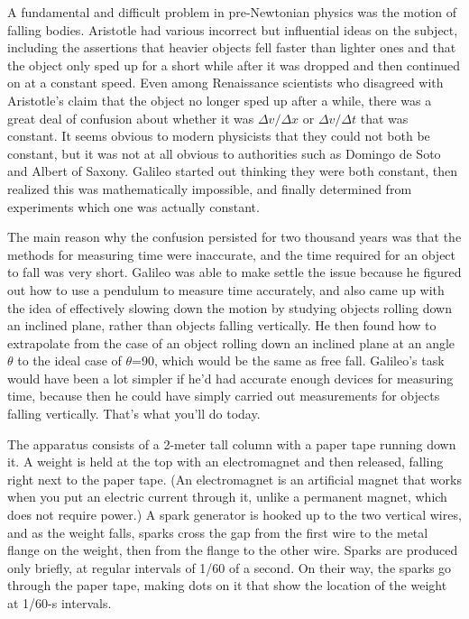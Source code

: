 \label{lab:free-fall}

\apparatus
{}


\introduction

A fundamental and difficult problem in pre-New\-ton\-ian physics
was the motion of falling bodies.  Aristotle had various
incorrect but influential ideas on the subject, including
the assertions that heavier objects fell faster than lighter
ones and that the object only sped up for a short while
after it was dropped and then continued on at a constant
speed. Even among Renaissance scientists who disagreed with
Aristotle's claim that the object no longer sped up after a
while, there was a great deal of confusion about whether it
was $\Delta v/\Delta x$ or $\Delta v/\Delta t$ that was
constant.  It seems obvious to modern physicists that they
could not both be constant, but it was not at all obvious to
authorities such as Domingo de Soto and Albert of Saxony. 
Galileo started out thinking they were both constant, then
realized this was mathematically impossible, and finally
determined from experiments which one was actually constant.

The main reason why the confusion persisted for two thousand
years was that the methods for measuring time were
inaccurate, and the time required for an object to fall was
very short.  Galileo was able to make settle the issue
because he figured out how to use a pendulum to measure time
accurately, and also came up with the idea of effectively
slowing down the motion by studying objects rolling down an
inclined plane, rather than objects falling vertically.  He
then found how to extrapolate from the case of an object
rolling down an inclined plane at an angle $\theta $ to the
ideal case of $\theta $=90\degunit, which would be the same
as free fall.  Galileo's task would have been a lot simpler
if he'd had accurate enough devices for measuring time,
because then he could have simply carried out measurements
for objects falling vertically.  That's what you'll do today.



The apparatus consists of a 2-meter tall column with a paper
tape running down it.  A weight is held at the top with an
electromagnet and then released, falling right next to the
paper tape.  (An electromagnet is an artificial magnet that
works when you put an electric current through it, unlike a
permanent magnet, which does not require power.)  A spark
generator is hooked up to the two vertical wires, and as the
weight falls, sparks cross the gap from the first wire to
the metal flange on the weight, then from the flange to the
other wire.  Sparks are produced only briefly, at regular
intervals of 1/60 of a second.  On their way, the sparks go
through the paper tape, making dots on it that show the
location of the weight at 1/60-s intervals.


